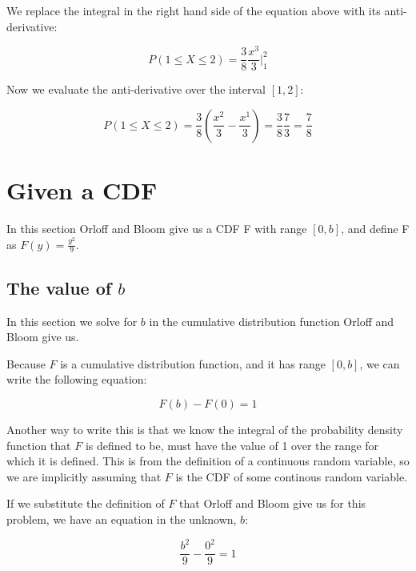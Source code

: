 \documentclass[a4paper,11pt]{article}
\begin{document}
We replace the integral in the right hand side of the equation above with its
anti-derivative:

\begin{equation}
P \left( 1 \leq X \leq 2 \right) = \frac{3}{8} \frac{x^{3}}{3} \bigg\rvert_{1}^{2}
\end{equation}

Now we evaluate the anti-derivative over the interval $\left[ 1, 2 \right]$:

\begin{equation}
P \left( 1 \leq X \leq 2 \right)
  = \frac{3}{8} \left( \frac{x^{2}}{3} - \frac{x^{1}}{3} \right)
  = \frac{3}{8} \frac{7}{3}
  = \frac{7}{8}
\end{equation}

\section{Given a CDF}

In this section Orloff and Bloom give us a CDF F with range
$\left[ 0, b \right]$, and define F as $F\left( y \right) = \frac{y^{2}}{9}$.

\subsection{The value of $b$}

In this section we solve for $b$ in the cumulative distribution function Orloff
and Bloom give us.

Because $F$ is a cumulative distribution function, and it has range
$\left[ 0, b \right]$, we can write the following equation:

\begin{equation}
    F \left(b \right) - F\left(0 \right) = 1
\end{equation}

Another way to write this is that we know the integral of the probability
density function that $F$ is defined to be, must have the value of 1 over
the range for which it is defined.  This is from the definition of a continuous
random variable, so we are implicitly assuming that $F$ is the CDF of some
continous random variable.

If we substitute the definition of $F$ that Orloff and Bloom give us for this
problem, we have an equation in the unknown, $b$:

\begin{equation}
  \frac{b^{2}}{9} - \frac{0^{2}}{9} = 1
\end{equation}
\end{document}
